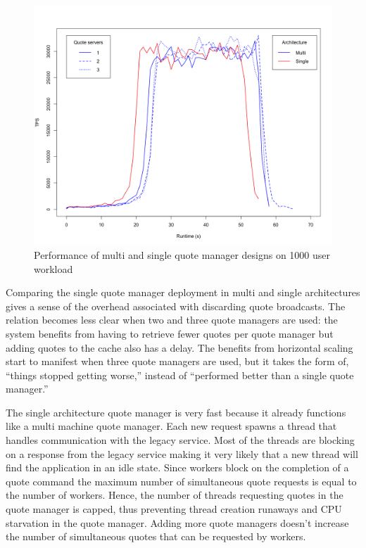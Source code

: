 \begin{figure}[tbph]
  \centering
  \includegraphics[width=0.85\linewidth]{../../data/tps/multi_vs_single_qs}
  \caption[Snoopy quote manager performance]{Performance of multi and single quote manager designs on 1000 user workload}
  \label{fig:snoopy-qs}
\end{figure}

Comparing the single quote manager deployment in multi and single architectures gives a sense of the overhead associated with discarding quote broadcasts.
The relation becomes less clear when two and three quote managers are used: the system benefits from having to retrieve fewer quotes per quote manager but adding quotes to the cache also has a delay.
The benefits from horizontal scaling start to manifest when three quote managers are used, but it takes the form of, ``things stopped getting worse,'' instead of ``performed better than a single quote manager.''

The single architecture quote manager is very fast because it already functions like a multi machine quote manager.
Each new request spawns a thread that handles communication with the legacy service.
Most of the threads are blocking on a response from the legacy service making it very likely that a new thread will find the application in an idle state.
Since workers block on the completion of a quote command the maximum number of simultaneous quote requests is equal to the number of workers.
Hence, the number of threads requesting quotes in the quote manager is capped, thus preventing thread creation runaways and CPU starvation in the quote manager.
Adding more quote managers doesn't increase the number of simultaneous quotes that can be requested by workers.

